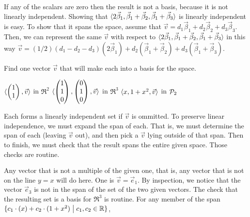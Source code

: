 \begin{exercises}
\begin{answer}
\begin{exparts}
           If any of the scalars are zero then the result is not a basis,
           because it is not linearly independent.
         \partsitem Showing that 
           $\langle2\vec{\beta}_1,\vec{\beta}_1+\vec{\beta}_2,
             \vec{\beta}_1+\vec{\beta}_3\rangle$ is linearly independent is easy. 
           To show that it spans the space, assume that
           \( \vec{v}=d_1\vec{\beta}_1+d_2\vec{\beta}_2+d_3\vec{\beta}_3 \).
           Then, we can represent the same \( \vec{v} \) with respect to
           \( \langle2\vec{\beta}_1,\vec{\beta}_1+\vec{\beta}_2,
                         \vec{\beta}_1+\vec{\beta}_3\rangle \)
           in this way
           $\vec{v}=(1/2)(d_1-d_2-d_3)(2\vec{\beta}_1)
           +d_2(\vec{\beta}_1+\vec{\beta}_2)+d_3(\vec{\beta}_1+\vec{\beta}_3)$.
      \end{exparts}   
    \end{answer}
  \item 
    Find one vector $\vec{v}$ that will make each into a basis
    for the space.
    \begin{exparts*}
      \partsitem $\langle\begin{pmatrix} 1 \\ 1 \end{pmatrix},\vec{v}\rangle$ in $\Re^2$
      \partsitem $\langle\begin{pmatrix} 1 \\ 1 \\ 0 \end{pmatrix},
                            \begin{pmatrix} 0 \\ 1 \\ 0 \end{pmatrix},\vec{v}\rangle$ in $\Re^3$
      \partsitem $\langle x,1+x^2,\vec{v}\rangle$ in $\mathcal{P}_2$
    \end{exparts*} 
    \begin{answer}
      Each forms a linearly independent set if $\vec{v}$ is ommitted.
      To preserve linear independence, we must expand the span of each.
      That is, we must determine the span of each (leaving $\vec{v}$ out),
      and then pick a $\vec{v}$ lying outside of that span.
      Then to finish, we must check that the result spans the entire given
      space.
      Those checks are routine.
      \begin{exparts}
        \partsitem Any vector that is not a multiple of the given one, 
          that is, any vector that is not on the line $y=x$ will do here.
          One is $\vec{v}=\vec{e}_1$.
        \partsitem By inspection, we notice that the vector $\vec{e}_3$ is
          not in the span of the set of the two given vectors.
          The check that the resulting set is a basis for $\Re^3$ is 
          routine.
        \partsitem For any member of the span 
          $\mbox{$\{c_1\cdot(x)+c_2\cdot(1+x^2)\bigm| c_1,c_2\in\mathbb{R}\}$}$,

\end{exparts}
\end{answer}
\end{exercises}

